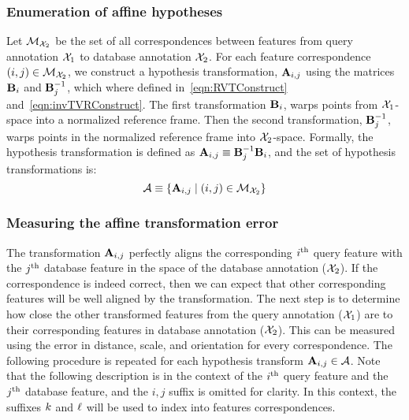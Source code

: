         \subsubsection{Enumeration of affine hypotheses}
            Let $\mathcal{M}_{\mathcal{X}_{2}}$ be the set of all correspondences between features from query annotation
            $\mathcal{X}_{1}$ to database annotation $\mathcal{X}_{2}$. For each feature correspondence $(i, j) \in
            \mathcal{M}_{\mathcal{X}_{2}}$, we construct a hypothesis transformation, $\mathbf{A}_{i, j}$ using the matrices
            $\mathbf{B}_{i}$ and $\mathbf{B}_{j}^{-1}$, which where defined in~\cref{eqn:RVTConstruct}
            and~\cref{eqn:invTVRConstruct}. The first transformation $\mathbf{B}_{i}$, warps points from
            $\mathcal{X}_{1}$-space into a normalized reference frame. Then the second transformation, $\mathbf{B}_{j}^{-1}$,
            warps points in the normalized reference frame into $\mathcal{X}_{2}$-space. Formally, the hypothesis
            transformation is defined as $\mathbf{A}_{i, j} \equiv \mathbf{B}_{j}^{-1}\mathbf{B}_{i}$, and the set of hypothesis
            transformations is:
            \begin{equation}
                \mathcal{A} \equiv \left\{ \mathbf{A}_{i, j} \mid (i, j) \in \mathcal{M}_{\mathcal{X}_{2}} \right\}
            \end{equation}

        \subsubsection{Measuring the affine transformation error}
            The transformation $\mathbf{A}_{i, j}$ perfectly aligns the corresponding $i^{\textrm{th}}{}$ query feature with the
            $j^{\textrm{th}}{}$ database feature in the space of the database annotation ($\mathcal{X}_{2}$). If the correspondence
            is indeed correct, then we can expect that other corresponding features will be well aligned by the
            transformation. The next step is to determine how close the other transformed features from the query
            annotation ($\mathcal{X}_{1}$) are to their corresponding features in database annotation ($\mathcal{X}_{2}$). This
            can be measured using the error in distance, scale, and orientation for every correspondence. The
            following procedure is repeated for each hypothesis transform %
            $\mathbf{A}_{i, j} \in \mathcal{A}$. Note that the following description is in the context of the $i^{\textrm{th}}{}$ query
            feature and the $j^{\textrm{th}}{}$ database feature, and the $i,j$ suffix is omitted for clarity. In this
            context, the suffixes $k$ and $\ell$ will be used to index into features correspondences.

